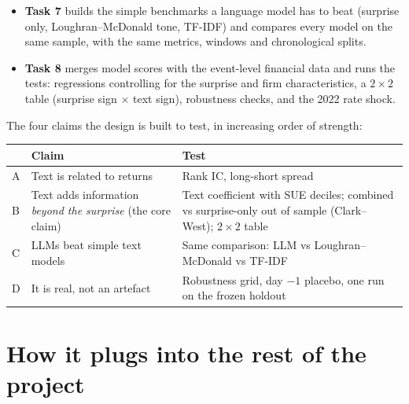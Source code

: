 \documentclass[11pt]{article}
\begin{document}
\begin{itemize}
  \item \textbf{Task 7} builds the simple benchmarks a language model has to beat (surprise only,
  Loughran--McDonald tone, TF-IDF) and compares every model on the same sample, with the same
  metrics, windows and chronological splits.
  \item \textbf{Task 8} merges model scores with the event-level financial data and runs the
  tests: regressions controlling for the surprise and firm characteristics, a $2\times2$ table
  (surprise sign $\times$ text sign), robustness checks, and the 2022 rate shock.
\end{itemize}

\noindent The four claims the design is built to test, in increasing order of strength:

\begin{center}
\begin{tabularx}{\linewidth}{@{}lYY@{}}
\toprule
& Claim & Test \\
\midrule
A & Text is related to returns & Rank IC, long-short spread \\
B & Text adds information \emph{beyond the surprise} (the core claim) & Text coefficient with SUE deciles; combined vs surprise-only out of sample (Clark--West); $2\times2$ table \\
C & LLMs beat simple text models & Same comparison: LLM vs Loughran--McDonald vs TF-IDF \\
D & It is real, not an artefact & Robustness grid, day $-1$ placebo, one run on the frozen holdout \\
\bottomrule
\end{tabularx}
\end{center}

\section{How it plugs into the rest of the project}
\end{document}
